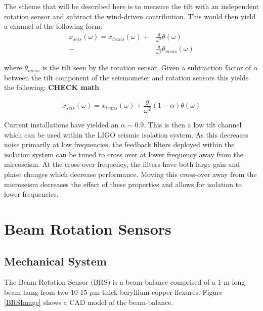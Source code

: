 \documentclass [12pt, proquest]{uwthesis}[2019]
\begin{document}
The scheme that will be described here is to measure the tilt with an independent rotation sensor and subtract the wind-driven contribution. This would then yield a channel of the following form:
\begin{align}
x_{seis}(\omega)=x_{trans}(\omega)+&\frac{g}{\omega^2}\theta(\omega)\\
-&\frac{g}{\omega^2}\theta_{meas}(\omega)
\end{align}

where $\theta_{meas}$ is the tilt seen by the rotation sensor. Given a subtraction factor of $\alpha$ between the tilt component of the seismometer and rotation sensors this yields the following: \textbf{CHECK math}

\[x_{seis}(\omega)=x_{trans}(\omega)+\frac{g}{\omega^2}(1-\alpha)\theta(\omega)\]

Current installations have yielded an $\alpha\sim 0.9$. This is then a low tilt channel which can be used within the LIGO seismic isolation system. As this decreases noise primarily at low frequencies, the feedback filters deployed within the isolation system can be tuned to cross over at lower frequency away from the mircoseism. At the cross over frequency, the filters have both large gain and phase changes which decrease performance. Moving this cross-over away from the microseism decreases the effect of these properties and allows for isolation to lower frequencies.

\section{Beam Rotation Sensors} \label{BRSSec}
\subsection{Mechanical System}

\quad The Beam Rotation Sensor (BRS) is a beam-balance comprised of a 1-m long beam hung from two 10-15 $\mu$m thick beryllium-copper flexures. Figure \ref{BRSImage} shows a CAD model of the beam-balance. 
\end{document}
